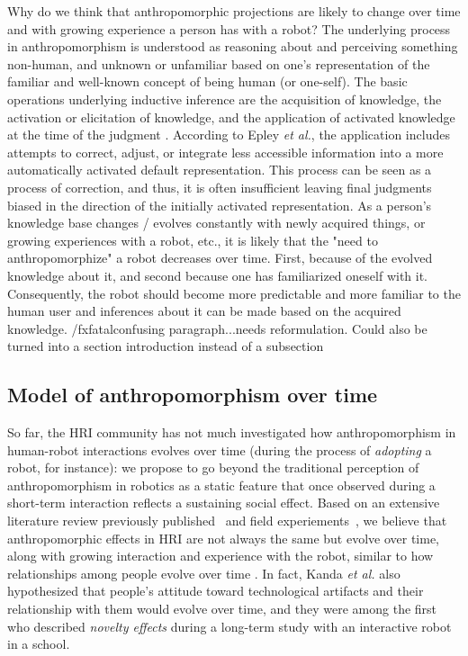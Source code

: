 \documentclass{frontiersSCNS} %
\begin{document}
Why do we think that anthropomorphic projections are likely to change over time
and with growing experience a person has with a robot? The underlying process in
anthropomorphism is understood as reasoning about and perceiving something
non-human, and unknown or unfamiliar based on one's representation of the
familiar and well-known concept of being human (or one-self). The basic
operations underlying inductive inference are the acquisition of knowledge, the
activation or elicitation of knowledge, and the application of activated
knowledge at the time of the judgment \cite{epley_when_2008}. According to Epley
\textit{et al.}, the application includes attempts to correct, adjust, or
integrate less accessible information into a more automatically activated
default representation. This process can be seen as a process of correction, and
thus, it is often insufficient leaving final judgments biased in the direction
of the initially activated representation. As a person's knowledge base changes
/ evolves constantly with newly acquired things, or growing experiences with a
robot, etc., it is likely that the "need to anthropomorphize" a robot decreases
over time. First, because of the evolved knowledge about it, and second because
one has familiarized oneself with it. Consequently, the robot should become more
predictable and more familiar to the human user and inferences about it can be
made based on the acquired knowledge.  /fxfatal{confusing paragraph...needs
reformulation. Could also be turned into a section introduction instead of a
subsection}


\subsection{Model of anthropomorphism over time}
\label{sec:modelintro}

So far, the HRI community has not much investigated how anthropomorphism in
human-robot interactions evolves over time (during the process of
\emph{adopting} a robot, for instance): we propose to go beyond the traditional
perception of anthropomorphism in robotics as a static feature that once
observed during a short-term interaction reflects a sustaining social effect.
Based on an extensive literature review previously
published~\cite{fink_anthropomorphism_2012} and field
experiements~, we believe that anthropomorphic effects in HRI are
not always the same but evolve over time, along with growing interaction and
experience with the robot, similar to how relationships among people evolve
over time . In fact, Kanda \textit{et al.}
\cite{kanda_interactive_2004} also hypothesized that people's attitude toward
technological artifacts and their relationship with them would evolve over
time, and they were among the first who described \textit{novelty effects}
during a long-term study with an interactive robot in a school.
\end{document}
